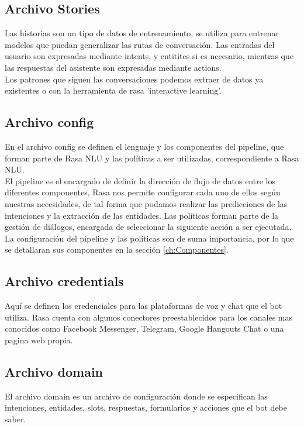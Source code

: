 \subsection{Archivo Stories}
Las historias son un tipo de datos de entrenamiento, se utiliza para entrenar modelos que puedan generalizar las rutas de conversación. Las entradas del usuario son expresadas mediante intents, y entitites si es necesario,  mientras que las respuestas del asistente son expresadas mediante actions.\\
Los patrones que siguen las conversaciones podemos extraer de datos ya existentes o con la herramienta de rasa 'interactive learning'.\cite{Stories_Documentation}

\subsection{Archivo config}
En el archivo config se definen el lenguaje y los componentes del pipeline, que forman parte de Rasa NLU y las políticas a ser utilizadas, correspondiente a Rasa NLU.\\
El pipeline es el encargado de definir la dirección de flujo de datos entre los diferentes componentes, Rasa nos permite configurar cada uno de ellos según nuestras necesidades, de tal forma que podamos realizar las predicciones de las intenciones y la extracción de las entidades. Las políticas forman parte de la gestión de diálogos, encargada de seleccionar la siguiente acción a ser ejecutada.\cite{Configuration_Documentation}\\
La configuración del pipeline y las políticas son de suma importancia, por lo que se detallaran sus componentes en la sección \ref{ch:Componentes}.

\subsection{Archivo credentials}
Aquí se definen los credenciales para las plataformas de voz y chat que el bot utiliza. Rasa cuenta con algunos conectores preestablecidos para los canales mas conocidos como Facebook Messenger, Telegram, Google Hangouts Chat o una pagina web propia.\cite{Credentials_Documentation}

\subsection{Archivo domain}
El archivo domain es un archivo de configuración donde se especifican las intenciones, entidades, slots, respuestas, formularios y acciones que el bot debe saber.\cite{Domain_Documentation}

